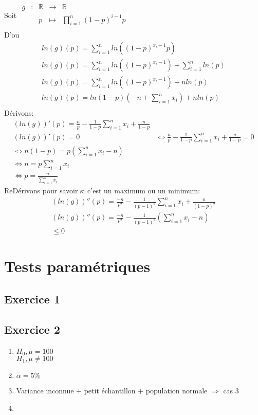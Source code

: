 \documentclass[12pt]{report}
\newcommand{\R}{\mathbb{R}}
\newcommand{\fct}[5]
	{
	  \begin{array}{ccccc}
		#1 & : & #2 & \to & #3 \\
	    && #4 & \mapsto & #5 \\
	  \end{array}
	}
\begin{document}
Soit $\fct{g}{\R}{\R}{p}{\prod_{i=1}^n (1-p)^{i-1}p}$\\
D'ou 
\begin{align*}
    ln(g)(p) = \sum_{i=1}^n ln((1-p)^{x_i-1}p)\\
    ln(g)(p) = \sum_{i=1}^n ln((1-p)^{x_i-1}) + \sum_{i=1}^n ln(p)\\
    ln(g)(p) = \sum_{i=1}^{n} ln((1-p)^{x_i-1}) + nln(p)\\
    ln(g)(p) = ln(1-p)(-n + \sum_{i=1}^{n} x_i)  + nln(p)\\
\end{align*}
Dérivons:
\begin{align*}
    (ln(g))'(p) = \frac{n}{p} - \frac{1}{1-p}\sum_{i=1}^{n} x_i + \frac{n}{1-p}\\
    (ln(g))'(p) = 0 &\Leftrightarrow \frac{n}{p} - \frac{1}{1-p}\sum_{i=1}^{n} x_i + \frac{n}{1-p} =0\\
    \Leftrightarrow n(1-p) = p (\sum_{i=1}^{n} x_i  - n)\\
    \Leftrightarrow n = p \sum_{i=1}^n x_i\\
    \Leftrightarrow p = \frac{n}{\sum_{i=1}^n x_i}
\end{align*}
ReDérivons pour savoir si c'est un maximum ou un minimum:\\
\begin{align*}
    (ln(g))''(p) = \frac{-n}{p^2} - \frac{1}{(p-1)^2}\sum_{i=1}^n x_i  + \frac{n}{(1-p)^2}\\
    (ln(g))''(p) = \frac{-n}{p^2} - \frac{1}{(p-1)^2}(\sum_{i=1}^n x_i   -n)\\
    \leq 0
\end{align*}

\chapter{Tests paramétriques}

\section{Exercice 1}
\section{Exercice 2}

\begin{enumerate}
    \item $H_0 , \mu = 100$ \\
          $H_1 , \mu \neq 100$ 
    \item $\alpha = 5 \%$
    \item Variance inconnue + petit échantillon + population normale $\Rightarrow$ cas 3
    \item $\frac{}{}$
\end{enumerate}
\end{document}
